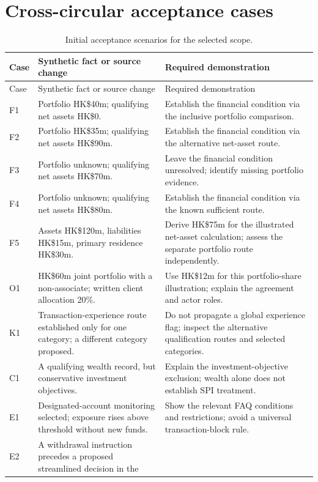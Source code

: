 \section{Cross-circular acceptance cases}
\begingroup\small
\begin{longtable}{P{0.09\textwidth}P{0.41\textwidth}P{0.4\textwidth}}
\caption{Initial acceptance scenarios for the selected scope.}
\label{tab:cases-detail}\\
\toprule Case & Synthetic fact or source change & Required demonstration \\\midrule
\endfirsthead
\toprule Case & Synthetic fact or source change & Required demonstration \\\midrule
\endhead
F1 & Portfolio HK\$40m; qualifying net assets HK\$0. & Establish the financial
condition via the inclusive portfolio comparison.\\
F2 & Portfolio HK\$35m; qualifying net assets HK\$90m. & Establish the financial
condition via the alternative net-asset route.\\
F3 & Portfolio unknown; qualifying net assets HK\$70m. & Leave the financial
condition unresolved; identify missing portfolio evidence.\\
F4 & Portfolio unknown; qualifying net assets HK\$80m. & Establish the financial
condition via the known sufficient route.\\
F5 & Assets HK\$120m, liabilities HK\$15m, primary residence HK\$30m. & Derive
HK\$75m for the illustrated net-asset calculation; assess the separate portfolio
route independently.\\
O1 & HK\$60m joint portfolio with a non-associate; written client allocation 20\%. &
Use HK\$12m for this portfolio-share illustration; explain the agreement and actor roles.\\
K1 & Transaction-experience route established only for one category; a different
category proposed. & Do not propagate a global experience flag; inspect the
alternative qualification routes and selected categories.\\
C1 & A qualifying wealth record, but conservative investment objectives. & Explain
the investment-objective exclusion; wealth alone does not establish SPI treatment.\\
E1 & Designated-account monitoring selected; exposure rises above threshold without
new funds. & Show the relevant FAQ conditions and restrictions; avoid a universal
transaction-block rule.\\
E2 & A withdrawal instruction precedes a proposed streamlined decision in the

\end{longtable}
